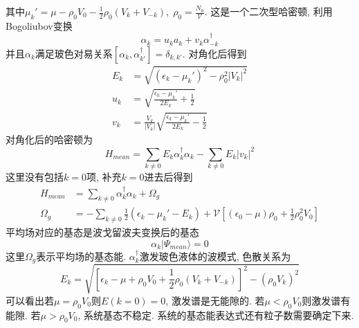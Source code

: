 \documentclass[a4paper,11pt]{article}
\begin{document}
其中$\mu_{k}'=\mu-\rho_0V_0-\frac{1}{2}\rho_0(V_{k}+V_{-k}),\;\rho_0=\frac{N_0}{\mathcal{V}}$. 这是一个二次型哈密顿, 利用Bogoliubov变换
\begin{equation*}
  \alpha_{k}=u_{k}a_{k}+v_{k}\alpha_{-k}^\dag
\end{equation*}
并且$\alpha_k$满足玻色对易关系$[\alpha_k,\alpha_{k'}^\dag]=\delta_{k,k'}$. 对角化后得到
\begin{equation*}
  \begin{split}
     E_k&=\sqrt{(\epsilon_k-\mu_k')^2-\rho_0^2|V_k|^2} \\
       u_k&=\sqrt{\frac{\epsilon_k-\mu_k'}{2E_k}+\frac{1}{2}} \\
       v_k&=\frac{V_k}{|V_k|}\sqrt{\frac{\epsilon_k-\mu_k'}{2E_k}-\frac{1}{2}}
  \end{split}
\end{equation*}
对角化后的哈密顿为
\begin{equation*}
  H_{mean}=\sum_{k\neq0}E_{k}\alpha_k^\dag\alpha_k-\sum_{k\neq0}E_k|v_k|^2
\end{equation*}
这里没有包括$k=0$项, 补充$k=0$进去后得到
\begin{equation*}
  \begin{split}
     H_{mean} & =\sum_{k\neq0}\alpha_k^\dag\alpha_k+\Omega_{g} \\
       \Omega_g&=-\sum_{k\neq0}\frac{1}{2}(\epsilon_k-\mu_k'-E_k)+\mathcal{V}[(\epsilon_0-\mu)\rho_0+\frac{1}{2}\rho_0^2V_0]
  \end{split}
\end{equation*}
平均场对应的基态是波戈留波夫变换后的基态
\begin{equation*}
  \alpha_k|\Psi_{mean}\rangle=0
\end{equation*}
这里$\Omega_g$表示平均场的基态能. $\alpha_k^\dag$激发玻色液体的波模式, 色散关系为
\begin{equation*}
  E_k=\sqrt{[\epsilon_k-\mu+\rho_0V_0+\frac{1}{2}\rho_0(V_k+V_{-k})]^2-(\rho_0V_k)^2}
\end{equation*}
可以看出若$\mu=\rho_0V_0$则$E(k=0)=0$,  激发谱是无能隙的. 若$\mu<\rho_0V_0$则激发谱有能隙. 若$\mu>\rho_0V_0$, 系统基态不稳定. 系统的基态能表达式还有粒子数需要确定下来.
\end{document}
